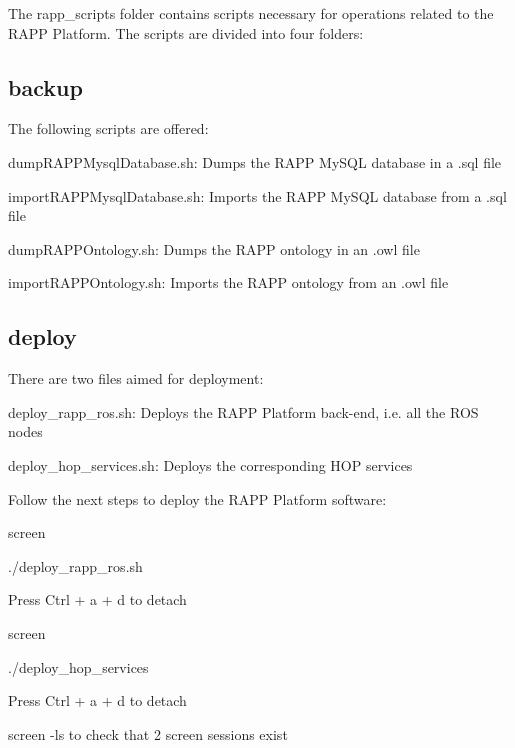 The {\ttfamily rapp\-\_\-scripts} folder contains scripts necessary for operations related to the R\-A\-P\-P Platform. The scripts are divided into four folders\-:

\subsection*{backup}

The following scripts are offered\-:
\begin{DoxyItemize}
\item {\ttfamily dump\-R\-A\-P\-P\-Mysql\-Database.\-sh}\-: Dumps the R\-A\-P\-P My\-S\-Q\-L database in a .sql file
\item {\ttfamily import\-R\-A\-P\-P\-Mysql\-Database.\-sh}\-: Imports the R\-A\-P\-P My\-S\-Q\-L database from a .sql file
\item {\ttfamily dump\-R\-A\-P\-P\-Ontology.\-sh}\-: Dumps the R\-A\-P\-P ontology in an .owl file
\item {\ttfamily import\-R\-A\-P\-P\-Ontology.\-sh}\-: Imports the R\-A\-P\-P ontology from an .owl file
\end{DoxyItemize}

\subsection*{deploy}

There are two files aimed for deployment\-:


\begin{DoxyItemize}
\item {\ttfamily deploy\-\_\-rapp\-\_\-ros.\-sh}\-: Deploys the R\-A\-P\-P Platform back-\/end, i.\-e. all the R\-O\-S nodes
\item {\ttfamily deploy\-\_\-hop\-\_\-services.\-sh}\-: Deploys the corresponding H\-O\-P services
\end{DoxyItemize}

Follow the next steps to deploy the R\-A\-P\-P Platform software\-:


\begin{DoxyItemize}
\item {\ttfamily screen}
\item {\ttfamily ./deploy\-\_\-rapp\-\_\-ros.sh}
\item Press Ctrl + a + d to detach
\item {\ttfamily screen}
\item {\ttfamily ./deploy\-\_\-hop\-\_\-services}
\item Press Ctrl + a + d to detach
\item {\ttfamily screen -\/ls} to check that 2 screen sessions exist
\end{DoxyItemize}

